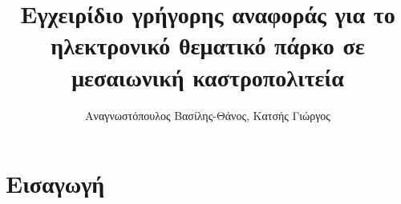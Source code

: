 \documentclass[a4paper,titlepage,twoside,12pt,leqno]{article}
\title{Εγχειρίδιο γρήγορης αναφοράς για το ηλεκτρονικό θεματικό πάρκο σε μεσαιωνική καστροπολιτεία}
\author{Αναγνωστόπουλος Βασίλης-Θάνος, Κατσής Γιώργος}
\date{}
\begin{document}
\maketitle
\tableofcontents
\listoffigures
\listoftables
\newpage

\section{Εισαγωγή}

\end{document}
